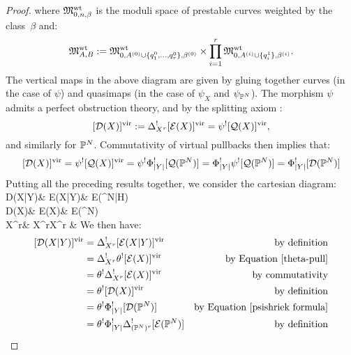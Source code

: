 \begin{proof}
\ecd
where $\mathfrak M_{0,n,\beta}^{\operatorname{wt}}$ is the moduli space of prestable curves weighted by the class~$\beta$ and:
\begin{equation*} \mathfrak M_{A,B}^{\operatorname{wt}} := \mathfrak M_{0,A^{(0)} \cup \{ q_1^0, \ldots, q_r^0 \}, \beta^{(0)}}^{\operatorname{wt}} \times \prod_{i=1}^r \mathfrak M_{0,A^{(i)} \cup \{ q_i^1 \},\beta^{(i)}}^{\operatorname{wt}}. \end{equation*}
The vertical maps in the above diagram are given by gluing together curves (in the case of $\psi$) and quasimaps (in the case of $\psi_X$ and $\psi_{\mathbb P^N}$). The morphism $\psi$ admits a perfect obstruction theory, and by the splitting axiom \cite[\S 2.3.3]{CF-K-higher-genus}:
\begin{equation*} [\mathcal{D}(X)]^{\mathrm{vir}} := \Delta_{X^r}^! [\mathcal{E}(X)]^{\mathrm{vir}} = \psi^! [\mathcal{Q}(X)]^{\mathrm{vir}}, \end{equation*}
and similarly for $\mathbb P^N$. Commutativity of virtual pullbacks then implies that:
\begin{equation} [\mathcal{D}(X)]^{\mathrm{vir}} = \label{psishriek formula} \psi^![\mathcal{Q}(X)]^{\mathrm{vir}}= \psi^! \Phi_{\lvert Y\rvert}^! [ \mathcal{Q}(\mathbb P^N)] = \Phi_{\lvert Y\rvert}^!\psi^![\mathcal{Q}(\mathbb P^N)] = \Phi_{\lvert Y\rvert}^! [ \mathcal{D}(\mathbb P^N) ]\end{equation}
Putting all the preceding results together, we consider the cartesian diagram:
\bcd
\mathcal D(X|Y)\ar[d]\ar[r] & \mathcal E(X|Y)\ar[d]\ar[r] & \mathcal E(\PP^N|H)\ar[d,"\theta"] \\
\mathcal D(X)\ar[d]\ar[r] & \mathcal E(X)\ar[d]\ar[r] & \mathcal E(\PP^N) \\
X^r\ar[r,"\Delta_{X^r}"] & X^r\times X^r & {}
\ecd
We then have:
\begin{align*} \virt{\mathcal D(X|Y)} & = \Delta_{X^r}^! \virt{\mathcal E(X|Y)} & \text{by definition}\\
& =  \Delta_{X^r}^! \theta^!\virt{\mathcal E(X)} & \text{by Equation \eqref{theta-pull}} \\
& =  \theta^!\Delta_{X^r}^! \virt{\mathcal E(X)} & \text{by commutativity} \\
& =  \theta^! \virt{\mathcal{D}(X)} & \text{by definition} \\
& =  \theta^!\Phi_{\lvert Y\rvert}^! [\mathcal{D}(\PP^N)] & \text{by Equation \eqref{psishriek formula}} \\
& =  \theta^!\Phi_{\lvert Y\rvert}^!\Delta_{(\PP^N)^r}^! [\mathcal E(\PP^N)] & \text{by definition} \\

\end{align*}
\end{proof}
